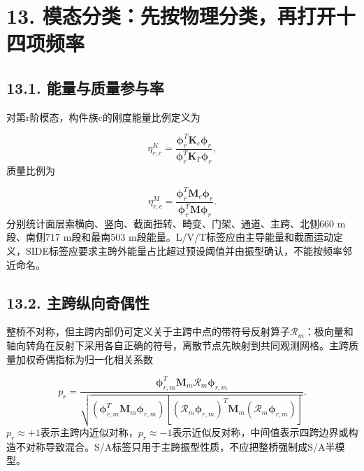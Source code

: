 \documentclass[UTF8,a4paper,11pt,fontset=none]{ctexart}
\begin{document}
\section*{13. 模态分类：先按物理分类，再打开十四项频率}
\subsection*{13.1. 能量与质量参与率}
对第r阶模态，构件族c的刚度能量比例定义为\par
\[
\eta_{r,c}^{K}=
\frac{\boldsymbol\phi_r^T\mathbf K_c\boldsymbol\phi_r}
{\boldsymbol\phi_r^T\mathbf K_T\boldsymbol\phi_r},
\]
质量比例为\par
\[
\eta_{r,c}^{M}=
\frac{\boldsymbol\phi_r^T\mathbf M_c\boldsymbol\phi_r}
{\boldsymbol\phi_r^T\mathbf M\boldsymbol\phi_r}.
\]
分别统计面层索横向、竖向、截面扭转、畸变、门架、通道、主跨、北侧660 m段、南侧717 m段和最南503 m段能量。L/V/T标签应由主导能量和截面运动定义，SIDE标签应要求主跨外能量占比超过预设阈值并由振型确认，不能按频率邻近命名。\par
{}
\subsection*{13.2. 主跨纵向奇偶性}
整桥不对称，但主跨内部仍可定义关于主跨中点的带符号反射算子\(\mathcal R_m\)\allowbreak{}：极向量和轴向转角在反射下采用各自正确的符号，离散节点先映射到共同观测网格。主跨质量加权奇偶指标为归一化相关系数\par
\[
p_r=
\frac{
\boldsymbol\phi_{r,m}^T\mathbf M_m
\mathcal R_m\boldsymbol\phi_{r,m}
}{
\sqrt{
(\boldsymbol\phi_{r,m}^T\mathbf M_m\boldsymbol\phi_{r,m})
[(\mathcal R_m\boldsymbol\phi_{r,m})^T\mathbf M_m
(\mathcal R_m\boldsymbol\phi_{r,m})]
}
}.
\]
\(p_r\approx+1\)\allowbreak{}表示主跨内近似对称，\(p_r\approx-1\)\allowbreak{}表示近似反对称，中间值表示四跨边界或构造不对称导致混合。S/A标签只用于主跨振型性质，不应把整桥强制成S/A半模型。\par
{}
\end{document}
